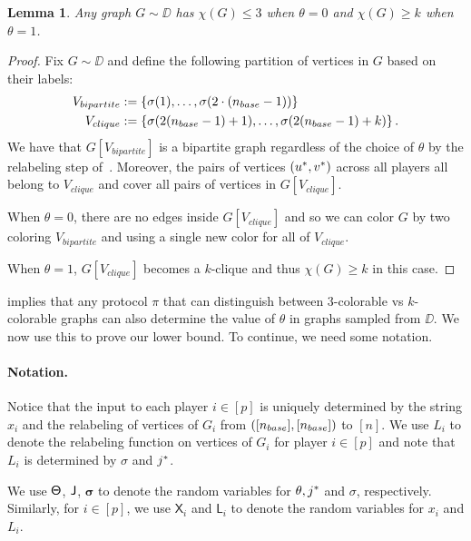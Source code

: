 \documentclass[11pt]{article}
\newtheorem{lemma}{Lemma}[section]
\theoremstyle{definition}
\renewcommand{\leq}{\leqslant}
\renewcommand{\geq}{\geqslant}
\newcommand{\set}[1]{\ensuremath{\left\{ #1 \right\}}}
\newcommand{\rv}[1]{\ensuremath{{\mathsf{#1}}}\xspace}
\newcommand{\rX}{\rv{X}}
\newcommand{\rL}{\rv{L}}
\newcommand{\rsigma}{\ensuremath{\bm{\sigma}}}
\begin{document}
\begin{lemma}\label{lem:colorable-distribution}
	Any graph $G \sim \DD$ has $\chi(G) \leq 3$ when $\theta=0$ and $\chi(G) \geq k$ when $\theta=1$. 
\end{lemma}

\begin{proof}
	Fix $G \sim \DD$ and define the following partition of vertices in $G$ based on their labels: 
	\begin{align*}
		V_{bipartite} &:= \set{\sigma(1),\ldots,\sigma(2 \cdot (\nbase-1))} \\ V_{clique} &:= \set{\sigma(2(\nbase-1)+1),\ldots,\sigma(2(\nbase-1)+k)}. 
	\end{align*}
	We have that $G[V_{bipartite}]$ is a bipartite graph regardless of the choice of $\theta$ by the relabeling step of~. Moreover, the pairs of vertices $(u^*,v^*)$ across all players all belong to $V_{clique}$ and 
	cover all pairs of vertices in $G[V_{clique}]$. 
	
	When $\theta=0$, there are no edges inside $G[V_{clique}]$ and so we can color $G$ by two coloring $V_{bipartite}$ and using a single new color for all of $V_{clique}$. 
	
	When $\theta=1$, $G[V_{clique}]$ becomes a $k$-clique and thus $\chi(G) \geq k$ in this case. 
\end{proof}

 implies that any protocol $\pi$ that can distinguish between $3$-colorable vs $k$-colorable graphs can also determine the value of $\theta$ in graphs sampled
from $\DD$. We now use this to prove our lower bound. To continue, we need some notation. 


\paragraph{Notation.}  Notice that the input to each player $i \in [p]$ is uniquely determined by the string $x_i$ and the relabeling of vertices of $G_i$ from $([n_{base}],[n_{base}])$ to $[n]$. 
We use $L_i$ to denote the relabeling function on vertices of $G_i$ for player $i \in [p]$ and note that $L_i$ is determined by $\sigma$ and $j^*$. 

We use $\rTheta$, $\rJ$, $\rsigma$ to denote the random variables for $\theta,j^*$ and $\sigma$, respectively. Similarly, for $i \in [p]$, we use $\rX_i$ and $\rL_i$ to denote the random variables for $x_i$ and $L_i$. 
\end{document}
